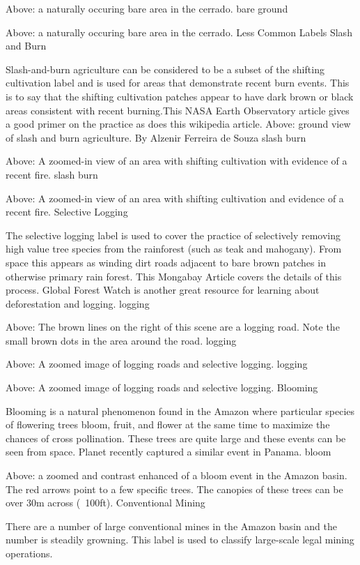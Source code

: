 Above: a naturally occuring bare area in the cerrado. bare ground

Above: a naturally occuring bare area in the cerrado.
Less Common Labels
Slash and Burn

Slash-and-burn agriculture can be considered to be a subset of the shifting cultivation label and is used for areas that demonstrate recent burn events. This is to say that the shifting cultivation patches appear to have dark brown or black areas consistent with recent burning.This NASA Earth Observatory article gives a good primer on the practice as does this wikipedia article. Above: ground view of slash and burn agriculture. By Alzenir Ferreira de Souza slash burn

Above: A zoomed-in view of an area with shifting cultivation with evidence of a recent fire. slash burn

Above: A zoomed-in view of an area with shifting cultivation and evidence of a recent fire.
Selective Logging

The selective logging label is used to cover the practice of selectively removing high value tree species from the rainforest (such as teak and mahogany). From space this appears as winding dirt roads adjacent to bare brown patches in otherwise primary rain forest. This Mongabay Article covers the details of this process. Global Forest Watch is another great resource for learning about deforestation and logging. logging

Above: The brown lines on the right of this scene are a logging road. Note the small brown dots in the area around the road. logging

Above: A zoomed image of logging roads and selective logging. logging

Above: A zoomed image of logging roads and selective logging.
Blooming

Blooming is a natural phenomenon found in the Amazon where particular species of flowering trees bloom, fruit, and flower at the same time to maximize the chances of cross pollination. These trees are quite large and these events can be seen from space. Planet recently captured a similar event in Panama. bloom

Above: a zoomed and contrast enhanced of a bloom event in the Amazon basin. The red arrows point to a few specific trees. The canopies of these trees can be over 30m across (~100ft).
Conventional Mining

There are a number of large conventional mines in the Amazon basin and the number is steadily growning. This label is used to classify large-scale legal mining operations.

